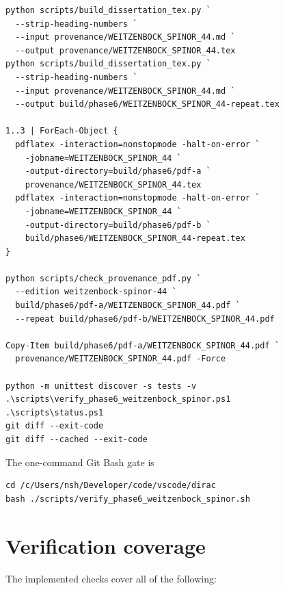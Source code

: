 \documentclass[11pt]{article}
\begin{document}
\begin{Verbatim}[fontsize=\small]
python scripts/build_dissertation_tex.py `
  --strip-heading-numbers `
  --input provenance/WEITZENBOCK_SPINOR_44.md `
  --output provenance/WEITZENBOCK_SPINOR_44.tex
python scripts/build_dissertation_tex.py `
  --strip-heading-numbers `
  --input provenance/WEITZENBOCK_SPINOR_44.md `
  --output build/phase6/WEITZENBOCK_SPINOR_44-repeat.tex

1..3 | ForEach-Object {
  pdflatex -interaction=nonstopmode -halt-on-error `
    -jobname=WEITZENBOCK_SPINOR_44 `
    -output-directory=build/phase6/pdf-a `
    provenance/WEITZENBOCK_SPINOR_44.tex
  pdflatex -interaction=nonstopmode -halt-on-error `
    -jobname=WEITZENBOCK_SPINOR_44 `
    -output-directory=build/phase6/pdf-b `
    build/phase6/WEITZENBOCK_SPINOR_44-repeat.tex
}

python scripts/check_provenance_pdf.py `
  --edition weitzenbock-spinor-44 `
  build/phase6/pdf-a/WEITZENBOCK_SPINOR_44.pdf `
  --repeat build/phase6/pdf-b/WEITZENBOCK_SPINOR_44.pdf

Copy-Item build/phase6/pdf-a/WEITZENBOCK_SPINOR_44.pdf `
  provenance/WEITZENBOCK_SPINOR_44.pdf -Force

python -m unittest discover -s tests -v
.\scripts\verify_phase6_weitzenbock_spinor.ps1
.\scripts\status.ps1
git diff --exit-code
git diff --cached --exit-code
\end{Verbatim}

The one-command Git Bash gate is

\begin{Verbatim}[fontsize=\small]
cd /c/Users/nsh/Developer/code/vscode/dirac
bash ./scripts/verify_phase6_weitzenbock_spinor.sh
\end{Verbatim}

\section{Verification coverage}

The implemented checks cover all of the following:
\end{document}
